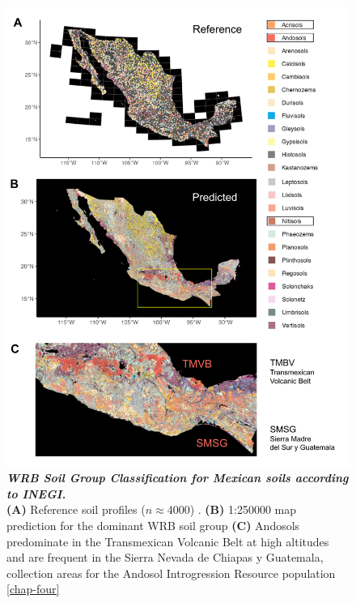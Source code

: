 \begin{figure}[!ht]
\centering
\includegraphics[width=0.9\linewidth]{Chapter-2/figs/WRB_inegi2013map.png}
\caption[WRB Soil Group Classification for Mexican soils according to INEGI]{\textit{\textbf{WRB Soil Group Classification for Mexican soils according to INEGI.}} \\\hspace{\textwidth}
\textbf{(A)} Reference soil profiles ($n \approx 4000$) \citep{inegi2013}.
\textbf{(B)} 1:250000 map prediction for the dominant WRB soil group \citep{inegi2015}
\textbf{(C)} Andosols predominate in the Transmexican Volcanic Belt at high altitudes and are frequent in the Sierra Nevada de Chiapas y Guatemala, collection areas for the Andosol Introgression Resource population \autoref{chap-four}}
\label{fig::WRB_inegi2013map}
\end{figure}
\clearpage



